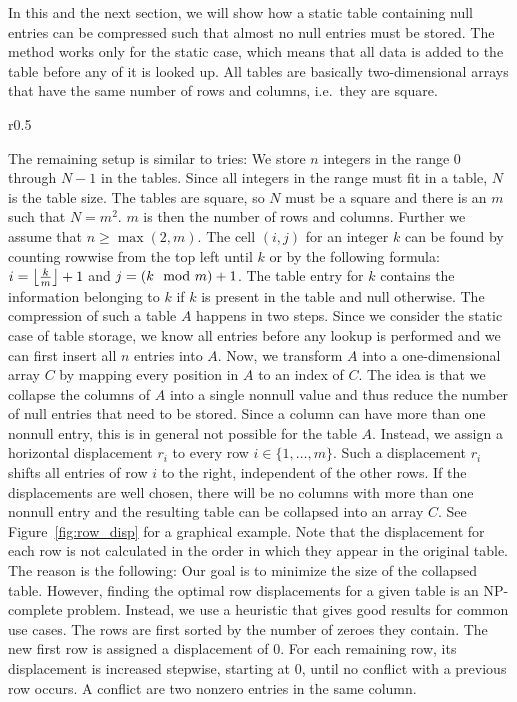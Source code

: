 In this and the next section, we will show how a static table containing null entries can be compressed such that almost no null entries must be stored.
The method works only for the static case, which means that all data is added to the table before any of it is looked up.
All tables are basically two-dimensional arrays that have the same number of rows and columns, i.e.\ they are square.

\begin{wrapfigure}{r}{0.5\textwidth}
  
	\caption{ \small Rows of a table displaced and collapsed into a one-dimensional array. \label{fig:row_disp}}
\end{wrapfigure}

The remaining setup is similar to tries:
We store $n$ integers in the range $0$ through $N - 1$ in the tables.
Since all integers in the range must fit in a table, $N$ is the table size.
The tables are square, so $N$ must be a square and there is an $m$ such that $N = m^2$.
$m$ is then the number of rows and columns.
Further we assume that $n \geq \max(2, m)$.
The cell $(i, j)$ for an integer $k$ can be found by counting rowwise from the top left until $k$ or by the following formula: $i = \left\lfloor \frac{k}{m} \right\rfloor + 1$ and $j = \left( k \mod m \right) + 1$.
The table entry for $k$ contains the information belonging to $k$ if $k$ is present in the table and null otherwise.
The compression of such a table $A$ happens in two steps.
Since we consider the static case of table storage, we know all entries before any lookup is performed and we can first insert all $n$ entries into $A$.
Now, we transform $A$ into a one-dimensional array $C$ by mapping every position in $A$ to an index of $C$.
The idea is that we collapse the columns of $A$ into a single nonnull value and thus reduce the number of null entries that need to be stored.
Since a column can have more than one nonnull entry, this is in general not possible for the table $A$.
Instead, we assign a horizontal displacement $r_i$ to every row $i \in \{ 1, \ldots, m \}$.
Such a displacement $r_i$ shifts all entries of row $i$ to the right, independent of the other rows.
If the displacements are well chosen, there will be no columns with more than one nonnull entry and the resulting table can be collapsed into an array $C$.
See Figure~\ref{fig:row_disp} for a graphical example.
Note that the displacement for each row is not calculated in the order in which they appear in the original table.
The reason is the following:
Our goal is to minimize the size of the collapsed table.
However, finding the optimal row displacements for a given table is an NP-complete problem.
Instead, we use a heuristic that gives good results for common use cases.
The rows are first sorted by the number of zeroes they contain.
The new first row is assigned a displacement of 0.
For each remaining row, its displacement is increased stepwise, starting at 0, until no conflict with a previous row occurs.
A conflict are two nonzero entries in the same column.

